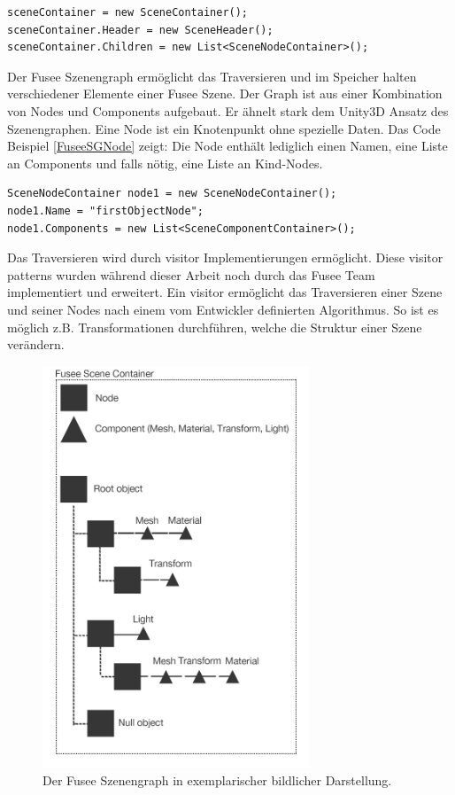 \documentclass[pagesize, paper=a4, fontsize=12pt, titlepage=true, headings=small, headnosepline, abstractoff, liststotoc, nochapterprefix, plainheadsepline, twoside]{scrreprt}
\begin{document}
\begin{lstlisting}[caption = Anlegen eines Fusee SceneContainers und damit Verwendung des Szenengraphen., label=FuseeSGSceneContainer]
sceneContainer = new SceneContainer();
sceneContainer.Header = new SceneHeader();
sceneContainer.Children = new List<SceneNodeContainer>();
\end{lstlisting}

Der Fusee Szenengraph ermöglicht das Traversieren und im Speicher halten verschiedener Elemente einer Fusee Szene. Der Graph ist aus einer Kombination von Nodes und Components aufgebaut. Er ähnelt stark dem Unity3D Ansatz des Szenengraphen. Eine Node ist ein Knotenpunkt ohne spezielle Daten. Das Code Beispiel \ref{FuseeSGNode} zeigt: Die Node enthält lediglich einen Namen, eine Liste an Components und falls nötig, eine Liste an Kind-Nodes.

\begin{lstlisting}[caption = Anlegen eines Fusee Node Containers und initialisieren einer Component Liste., label=FuseeSGNode]
SceneNodeContainer node1 = new SceneNodeContainer();
node1.Name = "firstObjectNode";
node1.Components = new List<SceneComponentContainer>();
\end{lstlisting}

Das Traversieren wird durch visitor Implementierungen ermöglicht. Diese visitor patterns wurden während dieser Arbeit noch durch das Fusee Team implementiert und erweitert. Ein visitor ermöglicht das Traversieren einer Szene und seiner Nodes nach einem vom Entwickler definierten Algorithmus. So ist es möglich z.B. Transformationen durchführen, welche die Struktur einer Szene verändern.

\begin{figure}[ht]
	\centering
	\includegraphics[width=8cm]{Bilder/Fusee_Szenengraph_Vgl.jpg}
	\caption{Der Fusee Szenengraph in exemplarischer bildlicher Darstellung.}
	\label{FuseeSzenenGraph}
\end{figure}
\end{document}
